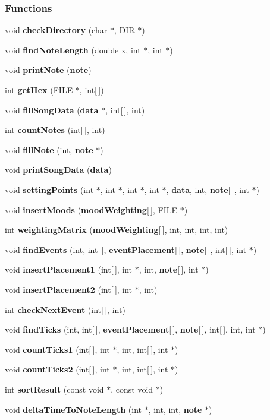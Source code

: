 \subsubsection*{Functions}
\begin{DoxyCompactItemize}
\item 
void {\bf check\+Directory} (char $\ast$, D\+I\+R $\ast$)
\item 
void {\bf find\+Note\+Length} (double x, int $\ast$, int $\ast$)
\item 
void {\bf print\+Note} ({\bf note})
\item 
int {\bf get\+Hex} (F\+I\+L\+E $\ast$, int[$\,$])
\item 
void {\bf fill\+Song\+Data} ({\bf data} $\ast$, int[$\,$], int)
\item 
int {\bf count\+Notes} (int[$\,$], int)
\item 
void {\bf fill\+Note} (int, {\bf note} $\ast$)
\item 
void {\bf print\+Song\+Data} ({\bf data})
\item 
void {\bf setting\+Points} (int $\ast$, int $\ast$, int $\ast$, int $\ast$, {\bf data}, int, {\bf note}[$\,$], int $\ast$)
\item 
void {\bf insert\+Moods} ({\bf mood\+Weighting}[$\,$], F\+I\+L\+E $\ast$)
\item 
int {\bf weighting\+Matrix} ({\bf mood\+Weighting}[$\,$], int, int, int, int)
\item 
void {\bf find\+Events} (int, int[$\,$], {\bf event\+Placement}[$\,$], {\bf note}[$\,$], int[$\,$], int $\ast$)
\item 
void {\bf insert\+Placement1} (int[$\,$], int $\ast$, int, {\bf note}[$\,$], int $\ast$)
\item 
void {\bf insert\+Placement2} (int[$\,$], int $\ast$, int)
\item 
int {\bf check\+Next\+Event} (int[$\,$], int)
\item 
void {\bf find\+Ticks} (int, int[$\,$], {\bf event\+Placement}[$\,$], {\bf note}[$\,$], int[$\,$], int, int $\ast$)
\item 
void {\bf count\+Ticks1} (int[$\,$], int $\ast$, int, int[$\,$], int $\ast$)
\item 
void {\bf count\+Ticks2} (int[$\,$], int $\ast$, int, int[$\,$], int $\ast$)
\item 
int {\bf sort\+Result} (const void $\ast$, const void $\ast$)
\item 
void {\bf delta\+Time\+To\+Note\+Length} (int $\ast$, int, int, {\bf note} $\ast$)
\item 

\end{DoxyCompactItemize}
